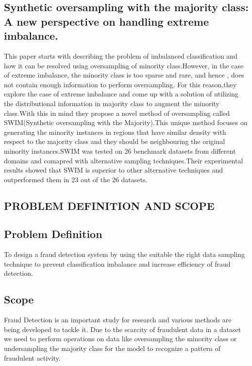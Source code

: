 \documentclass[a4paper, 12pt]{article}
\begin{document}
\subsection{Synthetic oversampling with the majority class: A new perspective on handling extreme imbalance.}
\hspace{1cm} This paper  starts with describing the problem of imbalanced classification and how it can be resolved using oversampling of minority class.However, in the case of extreme imbalance, the minority class is too sparse and rare, and hence , does not contain enough information to perform oversampling. For this reason,they explore the case of extreme imbalance and come up with a solution of utilizing the distributional information in majority class to augment the minority class.With this in mind they propose a novel method of oversampling called SWIM(Synthetic oversampling with the Majority).This unique method focuses on generating the minority instances in regions that have similar density with respect to the majority class and they should be neighbouring the original minority instances.SWIM was tested on 26 benchmark datasets from different domains and comapred with alternative sampling techniques.Their experimental results showed that SWIM is superior to other alternative techniques and outperformed them in 23 out of the 26 datasets.




\newpage
\begin{center}
\section{PROBLEM DEFINITION AND SCOPE}
\end{center}

\subsection{Problem Definition}

\hspace{1.5cm} To design a fraud detection system by using the suitable the right data sampling technique to prevent classification imbalance and increase efficiency of fraud detection.

\subsection{Scope}

\hspace{1.5cm} Fraud Detection is an important study for research and various methods are being developed to tackle it. Due to the scarcity of fraudulent data in a dataset we need to perform operations on data like oversampling the minority class or undersampling the majority class for the model to recognize a pattern of fraudulent activity. \\
\end{document}
